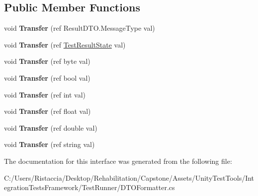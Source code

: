\subsection*{Public Member Functions}
\begin{DoxyCompactItemize}
\item 
\mbox{\label{interface_unity_test_1_1_d_t_o_formatter_1_1_i_transfer_interface_a6b6126b94a3e3954d327f22b695b7d72}} 
void {\bfseries Transfer} (ref Result\+D\+T\+O.\+Message\+Type val)
\item 
\mbox{\label{interface_unity_test_1_1_d_t_o_formatter_1_1_i_transfer_interface_aaf7f327d683c1310c444683e952289cf}} 
void {\bfseries Transfer} (ref \hyperlink{namespace_unity_test_ae932964473328b231e595f94d61ccc3b}{Test\+Result\+State} val)
\item 
\mbox{\label{interface_unity_test_1_1_d_t_o_formatter_1_1_i_transfer_interface_aa6176ff5419d52f3b06289084f0e89f1}} 
void {\bfseries Transfer} (ref byte val)
\item 
\mbox{\label{interface_unity_test_1_1_d_t_o_formatter_1_1_i_transfer_interface_a3e7fdeda374091896395702dca738871}} 
void {\bfseries Transfer} (ref bool val)
\item 
\mbox{\label{interface_unity_test_1_1_d_t_o_formatter_1_1_i_transfer_interface_a23634533048e2c542422efcea500643d}} 
void {\bfseries Transfer} (ref int val)
\item 
\mbox{\label{interface_unity_test_1_1_d_t_o_formatter_1_1_i_transfer_interface_a2da14fe11bd56001a4d7e0a3fac16275}} 
void {\bfseries Transfer} (ref float val)
\item 
\mbox{\label{interface_unity_test_1_1_d_t_o_formatter_1_1_i_transfer_interface_a011f5b5003bc1cab5415bcdac82fe2a0}} 
void {\bfseries Transfer} (ref double val)
\item 
\mbox{\label{interface_unity_test_1_1_d_t_o_formatter_1_1_i_transfer_interface_abff4c35b8878fda3f9a4619cb1180090}} 
void {\bfseries Transfer} (ref string val)
\end{DoxyCompactItemize}


The documentation for this interface was generated from the following file\+:\begin{DoxyCompactItemize}
\item 
C\+:/\+Users/\+Ristaccia/\+Desktop/\+Rehabilitation/\+Capstone/\+Assets/\+Unity\+Test\+Tools/\+Integration\+Tests\+Framework/\+Test\+Runner/D\+T\+O\+Formatter.\+cs\end{DoxyCompactItemize}
